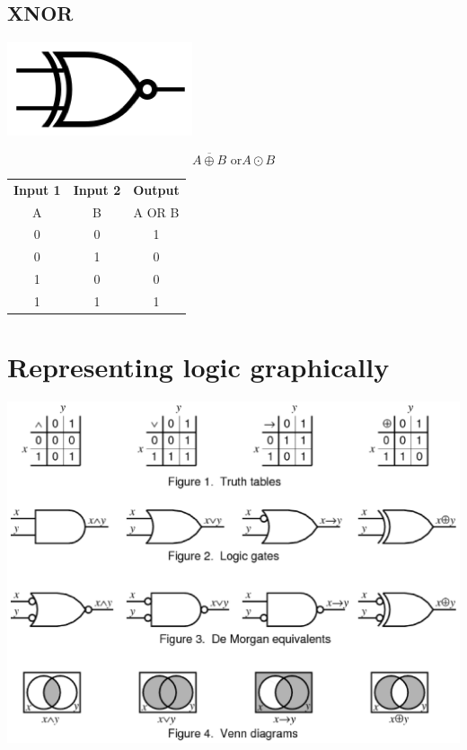 \documentclass[11pt]{book}
\begin{document}
\newpage

\subsection{XNOR}
\begin{center}
	\includegraphics{figures/20.07.png}
\end{center}
\begin{equation}
	\overline{A\oplus B} \text{ or} A \odot B
\end{equation}
\begin{center}
	\begin{tabular}{c c c}
		\textbf{Input 1} &  \textbf{Input 2} & \textbf{Output} \\
		A & B & A OR B \\
		0 & 0 & 1 \\
		0 & 1 & 0 \\
		1 & 0 & 0 \\
		1 & 1 & 1
	\end{tabular}
\end{center}

\section{Representing logic graphically}
\begin{center}
	\includegraphics[width = \textwidth]{figures/20.08.png}
\end{center}
\end{document}
